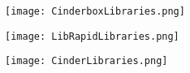 \begin{center}
	\begin{figure*}[htp]
		\texttt{[image: CinderboxLibraries.png]}
	\end{figure*}
\end{center}

\begin{center}
	\begin{figure*}[htp]
		\texttt{[image: LibRapidLibraries.png]}
	\end{figure*}
\end{center}

\begin{center}
	\begin{figure*}[htp]
		\texttt{[image: CinderLibraries.png]}
	\end{figure*}
\end{center}

